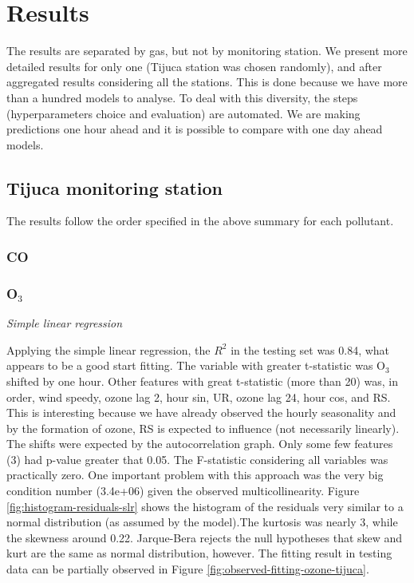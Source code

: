 \section{Results}
\label{sec:results}

The results are separated by gas, but not by monitoring station. We present
more detailed results for only one (Tijuca station was chosen randomly), and after aggregated results
considering all the stations. This is done because we have more than
a hundred models to analyse. To deal with this diversity, the steps
(hyperparameters choice and evaluation) are automated. We are
making predictions one hour ahead and it is possible to compare with one day
ahead models. 

\subsection{Tijuca monitoring station}

The results follow the order specified in the above summary for each pollutant. 

\subsubsection{CO}

\subsubsection{O\texorpdfstring{$_3$}{3}}

{\em Simple linear regression}

\vspace{2mm}

Applying the simple linear regression, the $R^2$ in the testing set was 0.84,
what appears to be a good start fitting. The variable with greater t-statistic
was O$_3$ shifted by one hour. Other features with great t-statistic (more than
20) was, in
order, wind speedy, ozone lag 2, hour sin, UR, ozone lag 24, hour cos, and RS.
This is interesting because we have already observed the hourly seasonality
and by the formation of ozone, RS is expected to influence (not necessarily
linearly). The shifts were expected by the autocorrelation graph. Only some few features (3) had p-value greater that 0.05. The
F-statistic considering all variables was practically zero. One important
problem with this approach was the very big condition number (3.4e+06) given
the observed multicollinearity. Figure \ref{fig:histogram-residuals-slr} shows
the histogram of the residuals very similar to a normal distribution (as
assumed by the model).The kurtosis was nearly 3, while the skewness around
0.22. Jarque-Bera rejects the null hypotheses that skew and kurt are the same
as normal distribution, however.  The fitting result in testing data can be
partially observed in Figure \ref{fig:observed-fitting-ozone-tijuca}.

